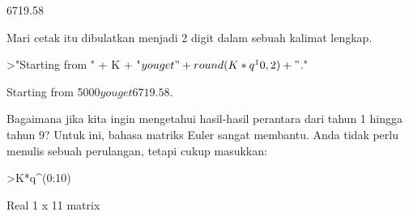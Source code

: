 \documentclass[a4paper,10pt]{article}
\begin{document}
\begin{eulernotebook}
\begin{eulercomment}
\begin{eulercomment}
\begin{eulercomment}
\begin{eulercomment}
\begin{eulercomment}
\begin{eulercomment}
\begin{eulercomment}
\begin{eulercomment}
\begin{eulercomment}
\begin{eulercomment}
\begin{euleroutput}
      6719.58 
\end{euleroutput}
\begin{eulercomment}
Mari cetak itu dibulatkan menjadi 2 digit dalam sebuah kalimat
lengkap.
\end{eulercomment}
\begin{eulerprompt}
>"Starting from " + K + "$ you get " + round(K*q^10,2) + "$."
\end{eulerprompt}
\begin{euleroutput}
  Starting from 5000$ you get 6719.58$.
\end{euleroutput}
\begin{eulercomment}
Bagaimana jika kita ingin mengetahui hasil-hasil perantara dari tahun
1 hingga tahun 9? Untuk ini, bahasa matriks Euler sangat membantu.
Anda tidak perlu menulis sebuah perulangan, tetapi cukup masukkan:
\end{eulercomment}
\begin{eulerprompt}
>K*q^(0:10)
\end{eulerprompt}
\begin{euleroutput}
  Real 1 x 11 matrix
  

\end{euleroutput}
\end{eulercomment}
\end{eulercomment}
\end{eulercomment}
\end{eulercomment}
\end{eulercomment}
\end{eulercomment}
\end{eulercomment}
\end{eulercomment}
\end{eulercomment}
\end{eulercomment}
\end{eulernotebook}
\end{document}
